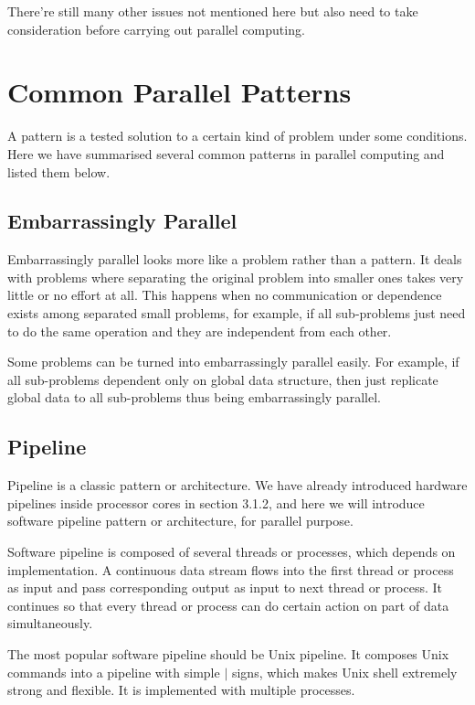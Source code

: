 \documentclass[12pt,a4]{report}
\begin{document}
There're still many other issues not mentioned here but also need to take consideration before carrying out parallel computing.

\section{Common Parallel Patterns}

A pattern is a tested solution to a certain kind of problem under some conditions. Here we have summarised several common patterns in parallel computing and listed them below.

\subsection{Embarrassingly Parallel}

Embarrassingly parallel looks more like a problem rather than a pattern. It deals with problems where separating the original problem into smaller ones takes very little or no effort at all. This happens when no communication or dependence exists among separated small problems, for example, if all sub-problems just need to do the same operation and they are independent from each other.

Some problems can be turned into embarrassingly parallel easily. For example, if all sub-problems dependent only on global data structure, then just replicate global data to all sub-problems thus being embarrassingly parallel.

\subsection{Pipeline}

Pipeline is a classic pattern or architecture. We have already introduced hardware pipelines inside processor cores in section 3.1.2, and here we will introduce software pipeline pattern or architecture, for parallel purpose.

Software pipeline is composed of several threads or processes, which depends on implementation. A continuous data stream flows into the first thread or process as input and pass corresponding output as input to next thread or process. It continues so that every thread or process can do certain action on part of data simultaneously.

The most popular software pipeline should be Unix pipeline. It composes Unix commands into a pipeline with simple $\mid$ signs, which makes Unix shell extremely strong and flexible. It is implemented with multiple processes.
\end{document}
